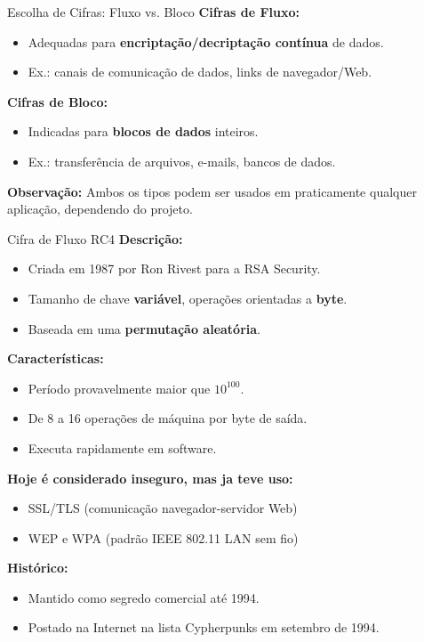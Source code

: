 \begin{frame}{Escolha de Cifras: Fluxo vs. Bloco}
\textbf{Cifras de Fluxo:}
\begin{itemize}
    \item Adequadas para \textbf{encriptação/decriptação contínua} de dados.
    \item Ex.: canais de comunicação de dados, links de navegador/Web.
\end{itemize}

\textbf{Cifras de Bloco:}
\begin{itemize}
    \item Indicadas para \textbf{blocos de dados} inteiros.
    \item Ex.: transferência de arquivos, e-mails, bancos de dados.
\end{itemize}

\textbf{Observação:} Ambos os tipos podem ser usados em praticamente qualquer aplicação, dependendo do projeto.
\end{frame}

\begin{frame}{Cifra de Fluxo RC4}
\textbf{Descrição:}
\begin{itemize}
    \item Criada em 1987 por Ron Rivest para a RSA Security.
    \item Tamanho de chave \textbf{variável}, operações orientadas a \textbf{byte}.
    \item Baseada em uma \textbf{permutação aleatória}.
\end{itemize}

\textbf{Características:}
\begin{itemize}
    \item Período provavelmente maior que $10^{100}$.
    \item De 8 a 16 operações de máquina por byte de saída.
    \item Executa rapidamente em software.
\end{itemize}

\textbf{Hoje é considerado inseguro, mas ja teve uso:}
\begin{itemize}
    \item SSL/TLS (comunicação navegador-servidor Web)
    \item WEP e WPA (padrão IEEE 802.11 LAN sem fio)
\end{itemize}

\textbf{Histórico:}
\begin{itemize}
    \item Mantido como segredo comercial até 1994.
    \item Postado na Internet na lista Cypherpunks em setembro de 1994.
\end{itemize}
\end{frame}

